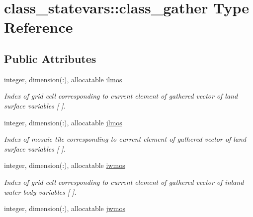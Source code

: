 \hypertarget{structclass__statevars_1_1class__gather}{}\section{class\+\_\+statevars\+:\+:class\+\_\+gather Type Reference}
\label{structclass__statevars_1_1class__gather}
\subsection*{Public Attributes}
\begin{DoxyCompactItemize}
\item 
\hypertarget{structclass__statevars_1_1class__gather_a70e338a05724e6bcaae0af2dd493d66a}{}integer, dimension(\+:), allocatable \hyperlink{structclass__statevars_1_1class__gather_a70e338a05724e6bcaae0af2dd493d66a}{ilmos}\label{structclass__statevars_1_1class__gather_a70e338a05724e6bcaae0af2dd493d66a}

\begin{DoxyCompactList}\small\item\em Index of grid cell corresponding to current element of gathered vector of land surface variables \mbox{[} \mbox{]}. \end{DoxyCompactList}\item 
\hypertarget{structclass__statevars_1_1class__gather_a4a39585d1a6078a5e9f66350c83c44b0}{}integer, dimension(\+:), allocatable \hyperlink{structclass__statevars_1_1class__gather_a4a39585d1a6078a5e9f66350c83c44b0}{jlmos}\label{structclass__statevars_1_1class__gather_a4a39585d1a6078a5e9f66350c83c44b0}

\begin{DoxyCompactList}\small\item\em Index of mosaic tile corresponding to current element of gathered vector of land surface variables \mbox{[} \mbox{]}. \end{DoxyCompactList}\item 
\hypertarget{structclass__statevars_1_1class__gather_afac5cf0cccc50c9e867ce8cd6f2ad76b}{}integer, dimension(\+:), allocatable \hyperlink{structclass__statevars_1_1class__gather_afac5cf0cccc50c9e867ce8cd6f2ad76b}{iwmos}\label{structclass__statevars_1_1class__gather_afac5cf0cccc50c9e867ce8cd6f2ad76b}

\begin{DoxyCompactList}\small\item\em Index of grid cell corresponding to current element of gathered vector of inland water body variables \mbox{[} \mbox{]}. \end{DoxyCompactList}\item 
\hypertarget{structclass__statevars_1_1class__gather_acb56c42877c77e33a9d68f80e67a0380}{}integer, dimension(\+:), allocatable \hyperlink{structclass__statevars_1_1class__gather_acb56c42877c77e33a9d68f80e67a0380}{jwmos}\label{structclass__statevars_1_1class__gather_acb56c42877c77e33a9d68f80e67a0380}


\end{DoxyCompactItemize}
